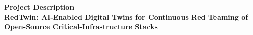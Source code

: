\documentclass[11pt,letterpaper]{article}
\newcommand{\sysname}{RedTwin\xspace}
\begin{document}


\clearpage

\setcounter{page}{1}

\begin{center}
  {\large\bfseries Project Description}\\[0.3em]
  {\large\bfseries \sysname: AI-Enabled Digital Twins for Continuous Red Teaming of Open-Source Critical-Infrastructure Stacks}
\end{center}









\end{document}
